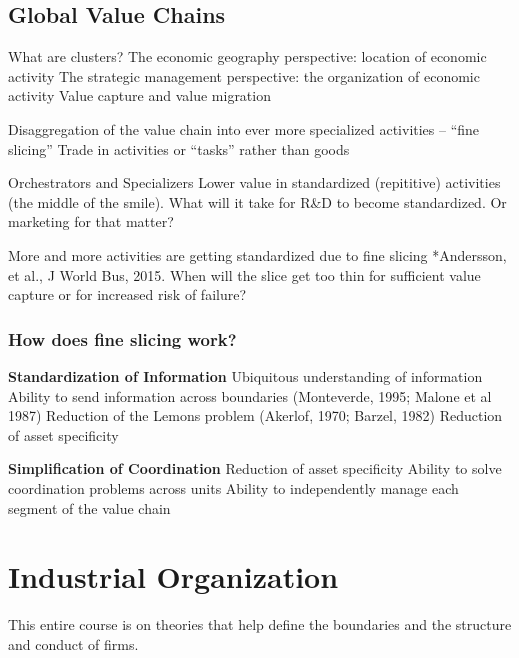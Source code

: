\documentclass[12pt,letterpaper]{article}
\begin{document}
\subsection{Global Value Chains}
What are clusters?
The economic geography perspective: location of economic activity 
The strategic management perspective: the organization of economic activity
\citep{Mudambi2008, Mudambi2010}
Value capture and value migration

Disaggregation of the value chain into ever more specialized activities – “fine slicing” \citep{Mudambi2008}
Trade in activities or “tasks” rather than goods

Orchestrators and Specializers
Lower value in standardized (repititive) activities (the middle of the smile). What will it take for R\&D to become standardized. Or marketing for that matter?

More and more activities are getting standardized due to fine slicing *Andersson, et al., J World Bus, 2015. When will the slice get too thin for sufficient value capture or for increased risk of failure?

\subsubsection{How does fine slicing work?} \citep{Jacobides2005b}

\textbf{Standardization of Information}
\indent Ubiquitous understanding of information \cite{Arrow1974, Argyres1999a}
\indent Ability to send information across boundaries (Monteverde, 1995; Malone et al 1987)
\indent Reduction of the Lemons problem (Akerlof, 1970; Barzel, 1982)
\indent Reduction of asset specificity \citep{Williamson1985, Klein1978}
\par
\textbf{Simplification of Coordination}
\indent Reduction of asset specificity \citep{Williamson1985, Klein1978}
\indent Ability to solve coordination problems across units \citep{Tushman1978, Puranam2003}
\indent Ability to independently manage each segment of the value chain \citep{Thompson1967, Baldwin2000, Robertson1995}
\par


\newpage

\section{Industrial Organization}
This entire course is on theories that help define the boundaries and the structure and conduct of firms.
\end{document}
